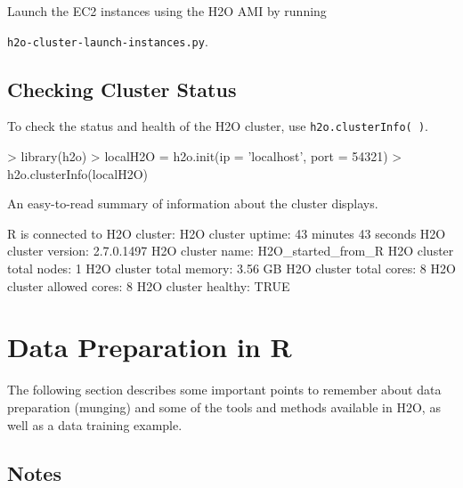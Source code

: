 \documentclass[11pt]{article}
\begin{document}
Launch the EC2 instances using the H2O AMI by running {\texttt{h2o-cluster-launch-instances.py}.


\subsection{Checking Cluster Status}


To check the status and health of the H2O cluster, use {\texttt{h2o.clusterInfo( )}}.
\begin{spverbatim}
> library(h2o)
> localH2O = h2o.init(ip = 'localhost', port = 54321)
> h2o.clusterInfo(localH2O)
\end{spverbatim}

An easy-to-read summary of information about the cluster displays. 
\begin{spverbatim}
R is connected to H2O cluster:
  H2O cluster uptime:         43 minutes 43 seconds
  H2O cluster version:        2.7.0.1497
  H2O cluster name:           H2O_started_from_R
  H2O cluster total nodes:    1
  H2O cluster total memory:   3.56 GB
  H2O cluster total cores:    8
  H2O cluster allowed cores:  8
  H2O cluster healthy:        TRUE
\end{spverbatim}


\section{Data Preparation in R}

The following section describes some important points to remember about data preparation (munging) and some of the tools and methods available in H2O, as well as a data training example. 

\subsection{Notes}
\begin{itemize}


\end{itemize}}
\end{document}
